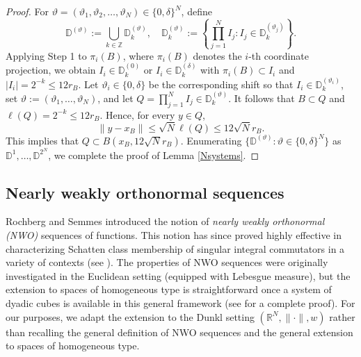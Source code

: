 \documentclass[12pt]{amsart}
\begin{document}
\begin{proof}
For $\vartheta=(\vartheta_1,\vartheta_2,\ldots,\vartheta_N)\in\{0,\delta\}^N$, define
$$\mathbb{D}^{(\vartheta)}:=\bigcup_{k\in\mathbb{Z}}\mathbb{D}_k^{(\vartheta)},\quad \mathbb{D}_k^{(\vartheta)}:=\left\{\prod_{j=1}^N I_j: I_j\in \mathbb{D}_k^{(\vartheta_j)}\right\}.$$
Applying Step 1 to $\pi_i(B)$, where $\pi_i(B)$ denotes the $i$-th coordinate projection, we obtain $I_i\in\mathbb{D}_k^{(0)}$ or $I_i\in\mathbb{D}_k^{(\delta)}$ with $\pi_i(B)\subset I_i$ and $|I_i|=2^{-k}\leq 12 r_B$. Let $\vartheta_i\in\{0,\delta\}$
be the corresponding shift so that $I_i\in\mathbb D_k^{(\vartheta_i)}$, set $\vartheta:=(\vartheta_1,\ldots,\vartheta_N)$, and let $Q=\prod_{j=1}^NI_j\in\mathbb{D}_k^{(\vartheta)}$. It follows that $B\subset Q$ and $\ell(Q)=2^{-k}\leq 12r_B$. Hence, for every $y\in Q$,
$$\|y-x_B\|\leq \sqrt{N}\ell(Q)\leq 12\sqrt{N}r_B.$$
This implies that $Q\subset B(x_B,12\sqrt{N}r_B)$. Enumerating $\big\{\mathbb D^{(\vartheta)}:\vartheta\in\{0,\delta\}^N\big\}$ as
$\mathbb D^1,\ldots,\mathbb D^{2^N}$, we complete the proof of Lemma \ref{Nsystems}.
\end{proof}





\subsection{Nearly weakly  orthonormal sequences}
Rochberg and Semmes \cite{RS} introduced the notion of \emph{nearly weakly  orthonormal (NWO)} sequences of functions. This notion has since proved highly effective in characterizing Schatten class membership of  singular integral commutators in a variety of contexts (see \cite{FLLXarxiv,HKarxiv,MR4756021,MR4552581,MR4873796,LLW,RS,Zhangwei1,Zhangwei2}). The properties of NWO sequences were originally investigated in the Euclidean setting (equipped with Lebesgue measure), but the extension to spaces of homogeneous type is straightforward once a system of dyadic cubes is available in this general framework (see \cite[Section 13]{HKarxiv} for a complete proof).  For our purposes, we adapt  the extension to the Dunkl setting $(\mathbb{R}^N,\|\cdot\|,w)$ rather than recalling the general  definition
of NWO sequences and the general extension to spaces of homogeneous type.
\end{document}
